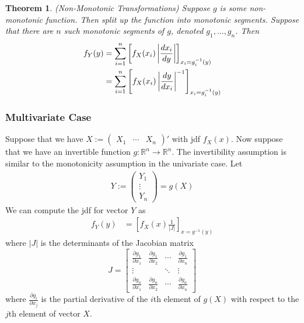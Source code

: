 \documentclass[12pt]{article}
\theoremstyle{plain}
\newtheorem{thm}{Theorem}[section]
\theoremstyle{definition}
\theoremstyle{remark}
\newcommand{\ra}{\rightarrow}
\newcommand{\Rn}{\mathbb{R}^n}
\newcommand{\sumin}{\sum^n_{i=1}}
\begin{document}
\begin{thm}\emph{(Non-Monotonic Transformations)}
Suppose $g$ is some non-monotonic function. Then split up the function
into monotonic segments. Suppose that there are $n$ such monotonic
segments of $g$, denoted $g_1,\ldots,g_n$. Then
\begin{align}
   \label{nonmontrans}
   f_Y(y)
   &= \sumin \left[ f_X(x_i) \left\lvert \frac{dx_i}{dy}
      \right\rvert \right]_{x_i=g_i^{-1}(y)}\\
   &= \sumin \left[ f_X(x_i) \left\lvert \frac{dy}{dx_i}
    \right\rvert^{-1} \right]_{x_i=g_i^{-1}(y)}
    \notag
\end{align}
\end{thm}


\subsubsection{Multivariate Case}

Suppose that we have
$X:=\begin{pmatrix}X_1 & \cdots & X_n\end{pmatrix}'$ with jdf
$f_{X}(x)$.
Now suppose that we have an invertible function $g:\Rn\ra\Rn$. The
invertibility assumption is similar to the monotonicity assumption in
the univariate case.  Let
\begin{align*}
  Y:= \begin{pmatrix} Y_1 \\ \vdots \\ Y_n \end{pmatrix}
  = g(X)
\end{align*}
We can compute the jdf for vector $Y$ as
\begin{align*}
  f_{Y}(y)
   &= \left[
      f_{X}(x)\frac{1}{\lvert J\rvert}
      \right]_{x=g^{-1}(y)}
\end{align*}
where $|J|$ is the determinants of the Jacobian matrix
\begin{equation}
   J = \begin{bmatrix} \frac{\partial g_1}{\partial x_1} &
      \frac{\partial g_1}{\partial x_2} & \cdots &
      \frac{\partial g_1}{\partial x_n} \\
      \vdots & & \ddots & \vdots \\
      \frac{\partial g_n}{\partial x_1} &
      \frac{\partial g_n}{\partial x_2} & \cdots &
      \frac{\partial g_n}{\partial x_n}
   \end{bmatrix}
\end{equation}
where $\frac{\partial g_i}{\partial x_j}$ is the partial derivative of
the $i$th element of $g(X)$ with respect to the $j$th element of vector
$X$.
\end{document}
